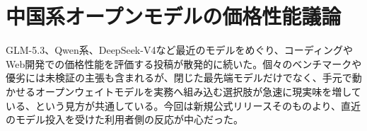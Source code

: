 \section{中国系オープンモデルの価格性能議論}
GLM-5.3、Qwen系、DeepSeek-V4など最近のモデルをめぐり、コーディングやWeb開発での価格性能を評価する投稿が散発的に続いた。個々のベンチマークや優劣には未検証の主張も含まれるが、閉じた最先端モデルだけでなく、手元で動かせるオープンウェイトモデルを実務へ組み込む選択肢が急速に現実味を増している、という見方が共通している。今回は新規公式リリースそのものより、直近のモデル投入を受けた利用者側の反応が中心だった。

